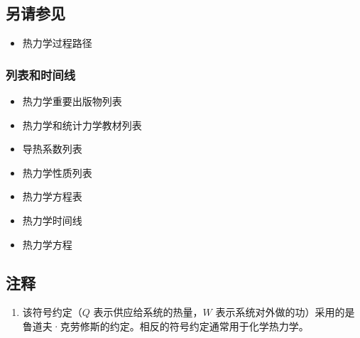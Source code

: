 \subsection{另请参见}
\begin{itemize}
\item 热力学过程路径
\end{itemize}
\subsubsection{列表和时间线}
\begin{itemize}
\item 热力学重要出版物列表
\item 热力学和统计力学教材列表
\item 导热系数列表
\item 热力学性质列表
\item 热力学方程表
\item 热力学时间线
\item 热力学方程
\end{itemize}
\subsection{注释}  
\begin{enumerate}
\item 该符号约定（\(Q\) 表示供应给系统的热量，\(W\) 表示系统对外做的功）采用的是鲁道夫·克劳修斯的约定。相反的符号约定通常用于化学热力学。
\end{enumerate}
